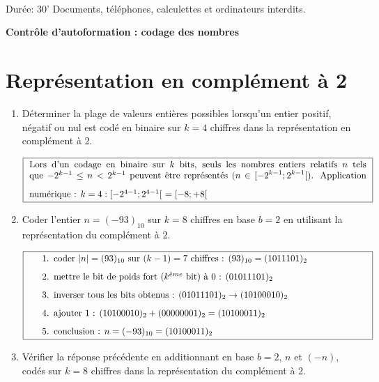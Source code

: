\documentclass[12pt]{article}
\def\entete#1{\framebox[12.6cm][l]{Nom : \hspace*{3.85cm} Prénom : \hspace*{3cm}Groupe : {\bf A}$\rule[-0.3cm]{0cm}{1cm}$}
\hfill
\framebox[0.7cm]{\bf \ 3 $\rule[-0.3cm]{0cm}{1cm}$}
\framebox[0.7cm]{\bf \ 2 $\rule[-0.3cm]{0cm}{1cm}$}
\framebox[0.7cm]{\bf \ 1 $\rule[-0.3cm]{0cm}{1cm}$}
\framebox[0.7cm]{\bf \ 0 $\rule[-0.3cm]{0cm}{1cm}$}\\[1mm]
{\footnotesize\sc Durée: 30'\hfill 
Documents, téléphones, calculettes et ordinateurs interdits.}\\[2mm]
\centerline{\bf #1}}
\begin{document}

\entete{Contrôle d'autoformation : codage des nombres}
\section{Représentation en complément à 2}
\begin{enumerate}
\item Déterminer la plage de valeurs entières possibles lorsqu'un
	entier positif, négatif ou nul est codé en binaire 
	sur $k = 4$ chiffres dans la représentation en complément à 2.
	
	$$\framebox[13.5cm]{\begin{minipage}{13cm}
	Lors d'un codage en binaire sur $k$ bits, 
	seuls les nombres entiers relatifs $n$ 
	tels que $-2^{k-1} \leq n < 2^{k-1}$ peuvent être représentés 
	($\displaystyle n \in [-2^{k-1};2^{k-1}[$).
	\vspace*{3mm}
	
	Application numérique : $k=4 : [-2^{4-1};2^{4-1}[ \ = [-8;+8[$
	\end{minipage}}$$

\item Coder l'entier $n = (- 93)_{10}$ sur $k = 8$ chiffres en base $b = 2$
	en utilisant la représentation du complément à 2.
	
	$$\framebox[13.5cm]{
\begin{minipage}{13cm}
\begin{enumerate}
\item coder $|n|=(93)_{10}$ sur $(k-1) = 7$ chiffres :
	$(93)_{10} = (1011101)_2$ 
\item mettre le bit de poids fort ($k^{\grave eme}$ bit) à $0$ :
        $(01011101)_2$ 
\item inverser tous les bits obtenus :
        $(01011101)_2 \rightarrow (10100010)_2$
\item ajouter 1 : 
	$(10100010)_2 + (00000001)_2 = (10100011)_2$
\item conclusion :
	$n = (-93)_{10} = (10100011)_2$
\end{enumerate}
\end{minipage}}$$

\item Vérifier la réponse précédente en additionnant en base $b=2$,
	$n$ et $(-n)$, codés sur $k = 8$ chiffres dans la représentation
	du complément à 2.


\end{enumerate}
\end{document}
